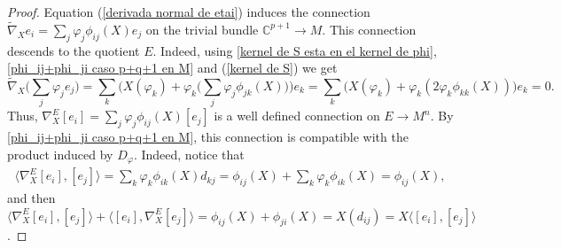 \documentclass{article}
\theoremstyle{remark}
\begin{document}
\begin{proof}
    Equation (\ref{derivada normal de etai}) induces the connection $\tilde{\nabla}_X e_i=\sum_j\varphi_j\phi_{ij}(X)e_j$ on the trivial bundle $\mathbb{C}^{p+1}\rightarrow M$. This connection descends to the quotient $E$. Indeed, using \ref{kernel de S esta en el kernel de phi},  \ref{phi_ij+phi_ji caso p+q+1 en M} and (\ref{kernel de S}) we get
    \begin{equation*}
        \tilde{\nabla}_X\Big(\sum_j\varphi_j e_j\Big)=\sum_k\Big(X(\varphi_k)+\varphi_k\big(\sum_j\varphi_j\phi_{jk}(X)\big)\Big)e_k=\sum_k\Big(X(\varphi_k)+\varphi_k(2\varphi_k\phi_{kk}(X))\Big)e_k=0.
    \end{equation*}
    Thus, $\nabla^E_X[e_i]=\sum_j \varphi_j\phi_{ij}(X)[e_j]$ is a well defined connection on $E\rightarrow M^n$. By \ref{phi_ij+phi_ji caso p+q+1 en M}, this connection is compatible with the product induced by $D_\varphi$. Indeed, notice that 
    \begin{align*}
        \langle\nabla^E_X[e_i],[e_j]\rangle=\sum_k \varphi_k\phi_{ik}(X)d_{kj}=\phi_{ij}(X)+\sum_k \varphi_k\phi_{ik}(X)=\phi_{ij}(X),
    \end{align*}
    and then $\langle\nabla^E_X[e_i],[e_j]\rangle+\langle[e_i],\nabla^E_X[e_j]\rangle=\phi_{ij}(X)+\phi_{ji}(X)=X(d_{ij})=X\langle[e_i],[e_j]\rangle$.
    

\end{proof}
\end{document}

